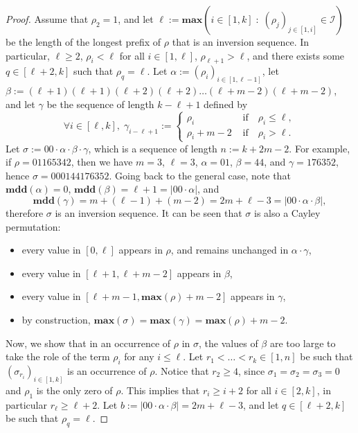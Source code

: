 \documentclass[10pt,a4paper]{amsart}
\newcommand{\I}{\mathcal{I}}
\renewcommand{\max}{\mathbf{max}}
\newcommand{\mdd}{\mathbf{mdd}}
\begin{document}
\begin{proof}
    Assume that $\rho_2 = 1$, and let $\ell := \max(i \in [1,k] \; : \; (\rho_j)_{j \in [1,i]} \in \I)$ be the length of the longest prefix of $\rho$ that is an inversion sequence. In particular, $\ell \geq 2$, $\rho_i < \ell$ for all $i \in [1,\ell]$, $\rho_{\ell+1} > \ell$, and there exists some $q \in [\ell+2,k]$ such that $\rho_q = \ell$.
    Let $\alpha := (\rho_i)_{i \in [1,\ell-1]}$, let $\beta := (\ell+1)(\ell+1)(\ell+2)(\ell+2) \dots (\ell+m-2)(\ell+m-2)$, and let $\gamma$ be the sequence of length $k-\ell+1$ defined by
    $$\forall i \in [\ell,k], \; \gamma_{i-\ell+1} := \begin{cases}
        \rho_{i} & \text{ if} \quad \rho_{i} \leq \ell, \\
        \rho_{i} + m-2 & \text{ if} \quad \rho_{i} > \ell.
    \end{cases}$$
    Let $\sigma := 00 \cdot \alpha \cdot \beta \cdot \gamma$, 
    which is a sequence of length $n := k+2m-2$. For example, if $\rho = 01165342$, then we have $m = 3$, $\ell = 3$, $\alpha = 01$, $\beta = 44$, and $\gamma = 176352$, hence $\sigma = 000144176352$.
    Going back to the general case, note that $\mdd(\alpha) = 0$, $\mdd(\beta) = \ell+1 = |00 \cdot\alpha|$, and $$\mdd(\gamma) = m+(\ell-1)+(m-2) = 2m+\ell-3 = |00 \cdot \alpha \cdot \beta|,$$ therefore $\sigma$ is an inversion sequence.
    It can be seen that $\sigma$ is also a Cayley permutation:
    \begin{itemize}
        \item every value in $[0, \ell]$ appears in $\rho$, and remains unchanged in $\alpha \cdot \gamma$,
        \item every value in $[\ell+1, \ell+m-2]$ appears in $\beta$,
        \item every value in $[\ell+m-1, \max(\rho)+m-2]$ appears in $\gamma$,
        \item by construction, $\max(\sigma) = \max(\gamma) = \max(\rho)+m-2$.
    \end{itemize}
    Now, we show that in an occurrence of $\rho$ in $\sigma$, the values of $\beta$ are too large to take the role of the term $\rho_i$ for any $i \leq \ell$. Let $r_1 < \dots < r_k \in [1,n]$ be such that $(\sigma_{r_i})_{i \in [1,k]}$ is an occurrence of $\rho$. Notice that $r_2 \geq 4$, since $\sigma_1 = \sigma_2 = \sigma_3 = 0$ and $\rho_1$ is the only zero of $\rho$. This implies that $r_i \geq i+2$ for all $i \in [2,k]$, in particular $r_{\ell} \geq \ell+2$. Let $b := |00 \cdot \alpha \cdot \beta| = 2m+\ell-3$, and let $q \in [\ell+2,k]$ be such that $\rho_q = \ell$.

\end{proof}
\end{document}
